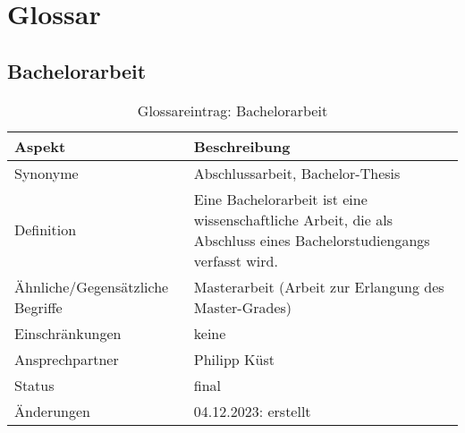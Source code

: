 \chapter{Glossar}\label{ch:glossar}


\section*{Bachelorarbeit}\label{sec:glossar_bachelorarbeit}
\begin{table}[H]
    \label{tab:glossar_bachelorarbeit}
    \begin{tabularx}{\textwidth}{|l|X|}
        \hline
        \textbf{Aspekt}                  & \textbf{Beschreibung}                                                                                              \\
        \hline
        Synonyme                         & Abschlussarbeit, Bachelor-Thesis                                                                                   \\
        \hline
        Definition                       & Eine Bachelorarbeit ist eine wissenschaftliche Arbeit, die als Abschluss eines Bachelorstudiengangs verfasst wird. \\
        \hline
        Ähnliche/Gegensätzliche Begriffe & Masterarbeit (Arbeit zur Erlangung des Master-Grades)                                                              \\
        \hline
        Einschränkungen                  & keine                                                                                                              \\
        \hline
        Ansprechpartner                  & Philipp Küst                                                                                                       \\
        \hline
        Status                           & final                                                                                                              \\
        \hline
        Änderungen                       & 04.12.2023: erstellt                                                                                               \\
        \hline
    \end{tabularx}
    \caption{Glossareintrag: Bachelorarbeit}
\end{table}


